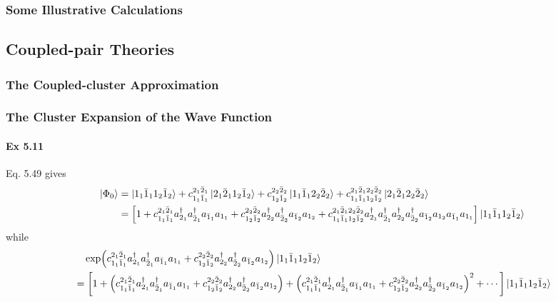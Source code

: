 \documentclass[a4paper]{article}
\newcommand{\ex}[1]{\paragraph{Ex #1}}
\numberwithin{equation}{subsection}
\begin{document}
\subsubsection{Some Illustrative Calculations}

\subsection{Coupled-pair Theories}
\subsubsection{The Coupled-cluster Approximation}

\subsubsection{The Cluster Expansion of the Wave Function}
\ex{5.11}
Eq. 5.49 gives
\begin{align}
\ket{\Phi_0} &= \ket{1_1 \bar{1}_1 1_2 \bar{1}_2} 
+ c_{1_1 \bar{1}_1}^{2_1 \bar{2}_1} \ket{2_1\bar{2}_1 1_2\bar{1}_2}
+ c_{1_2 \bar{1}_2}^{2_2 \bar{2}_2} \ket{1_1\bar{1}_1 2_2\bar{2}_2}
+ c_{1_1 \bar{1}_1 1_2 \bar{1}_2}^{2_1 \bar{2}_1 2_2 \bar{2}_2} \ket{2_1\bar{2}_1 2_2\bar{2}_2} \notag\\
&= \qty[1
+ c_{1_1 \bar{1}_1}^{2_1 \bar{2}_1} a^\dagger_{2_1}a^\dagger_{\bar{2}_1} a_{\bar{1}_1}a_{1_1} 
+ c_{1_2 \bar{1}_2}^{2_2 \bar{2}_2} a^\dagger_{2_2}a^\dagger_{\bar{2}_2} a_{\bar{1}_2}a_{1_2}  
+ c_{1_1 \bar{1}_1 1_2 \bar{1}_2}^{2_1 \bar{2}_1 2_2 \bar{2}_2} a^\dagger_{2_1}a^\dagger_{\bar{2}_1}a^\dagger_{2_2}a^\dagger_{\bar{2}_2} a_{\bar{1}_2}a_{1_2}a_{\bar{1}_1}a_{1_1} ] \ket{1_1\bar{1}_1 1_2\bar{1}_2} %
\end{align}
while
\begin{align}
& \quad \exp(c_{1_1 \bar{1}_1}^{2_1 \bar{2}_1} a^\dagger_{2_1}a^\dagger_{\bar{2}_1} a_{\bar{1}_1}a_{1_1} + c_{1_2 \bar{1}_2}^{2_2 \bar{2}_2} a^\dagger_{2_2}a^\dagger_{\bar{2}_2} a_{\bar{1}_2}a_{1_2}
) \ket{1_1 \bar{1}_1 1_2 \bar{1}_2} \notag\\
&= \qty[ 1 
+ \qty(c_{1_1 \bar{1}_1}^{2_1 \bar{2}_1} a^\dagger_{2_1}a^\dagger_{\bar{2}_1} a_{\bar{1}_1}a_{1_1} + c_{1_2 \bar{1}_2}^{2_2 \bar{2}_2} a^\dagger_{2_2}a^\dagger_{\bar{2}_2} a_{\bar{1}_2}a_{1_2}) 
+ \qty(c_{1_1 \bar{1}_1}^{2_1 \bar{2}_1} a^\dagger_{2_1}a^\dagger_{\bar{2}_1} a_{\bar{1}_1}a_{1_1} + c_{1_2 \bar{1}_2}^{2_2 \bar{2}_2} a^\dagger_{2_2}a^\dagger_{\bar{2}_2} a_{\bar{1}_2}a_{1_2})^2 + \cdots
] \ket{1_1 \bar{1}_1 1_2 \bar{1}_2} %
\end{align}
\end{document}
